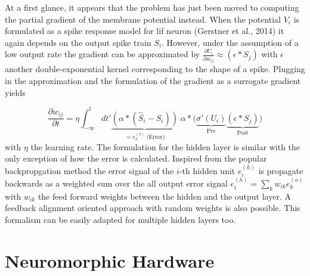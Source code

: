 At a first glance, it appears that the problem has just been moved to computing the partial gradient of the membrane potential instead. When the potential $V_i$ is formulated as a spike response model for \gls{lif} neuron (Gerstner et al., 2014) it again depends on the output spike train $S_i$. However, under the assumption of a low output rate the gradient can be approximated by $\frac{\partial U_i}{\partial w_{ij}} \approx (\epsilon \ast S_j)$ with $\epsilon$ another double-exponential kernel corresponding to the shape of a spike. Plugging in the approximation and the formulation of the gradient as a surrogate gradient yields

\begin{equation}
\label{superspikeweightupdateeq}
\frac{\partial w_{ij}}{\partial t} = \eta \int_{-\infty}^{t} dt'
\underbrace{\left(\alpha \ast (\hat{S}_i - S_i)\right)}_{= e^{(o)}_k \; \text{(Error)}} 
\; \alpha \ast 
\Big(\underbrace{\sigma'(U_i)}_{\text{Pre}} 
\underbrace{\left(\epsilon \ast S_j\right)}_{\text{Post}}\Big)
\end{equation}
with $\eta$ the learning rate. The formulation for the hidden layer is similar with the only exception of how the error is calculated. Inspired from the popular backpropgation method the error signal of the $i \text{-th}$ hidden unit $e^{(h)}_i$ is propagate backwards as a weighted sum over the all output error signal $e^{(h)}_i = \sum_{k} w_{ik} e^{(o)}_k$ with $w_{ik}$ the feed forward weights between the hidden and the output layer. A feedback alignment oriented approach with random weights is also possible. This formalism can be easily adapted for multiple hidden layers too.


%




\section{Neuromorphic Hardware}

